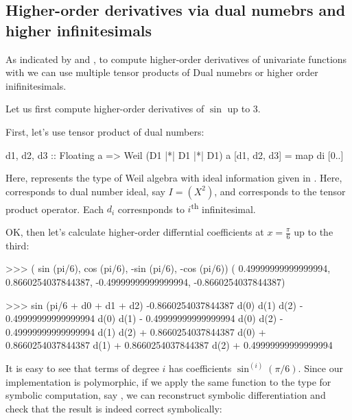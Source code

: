 \documentclass[%
  sigconf,authorversion,screen]{acmart}
\begin{document}
\subsection{Higher-order derivatives via dual numebrs and higher infinitesimals}
As indicated by  and ,
to compute higher-order derivatives of univariate functions with we can use multiple tensor products of Dual numebrs or higher order inifinitesimals.

Let us first compute higher-order derivatives of $\sin$ up to $3$.

First, let's use tensor product of dual numbers:
\begin{code}
d1, d2, d3
  :: Floating a
  => Weil (D1 |*| D1 |*| D1) a
[d1, d2, d3] = map di [0..]
\end{code}

Here,  represents the type of Weil algebra with ideal information given in .
Here,  corresponds to dual number ideal, say $I = (X^2)$, and \hask{|*|} corresponds to the tensor product operator.
Each $d_i$ corresnponds to $i$\textsuperscript{th} infinitesimal.

OK, then let's calculate higher-order differntial coefficients at $x = \frac{\pi}{6}$ up to the third:

\begin{code}
>>> ( sin (pi/6),  cos (pi/6), 
     -sin (pi/6), -cos (pi/6))
( 0.49999999999999994,
  0.8660254037844387,
 -0.49999999999999994,
 -0.8660254037844387)

>>> sin (pi/6 + d0 + d1 + d2)
-0.8660254037844387 d(0) d(1) d(2) 
  - 0.49999999999999994 d(0) d(1) 
  - 0.49999999999999994 d(0) d(2)
  - 0.49999999999999994 d(1) d(2) 
  + 0.8660254037844387 d(0) 
  + 0.8660254037844387 d(1) 
  + 0.8660254037844387 d(2) 
  + 0.49999999999999994
\end{code}

It is easy to see that terms of degree $i$ has coefficients $\sin^{(i)}(\pi/6)$.
Since our implementation is polymorphic, if we apply the same function to the type for symbolic computation, say , we can reconstruct symbolic differentiation and check that the result is indeed correct symbolically:

\end{document}
